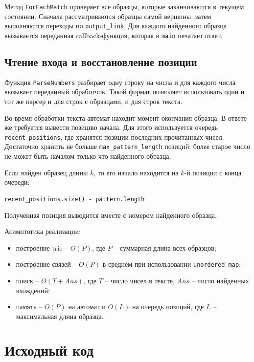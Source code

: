 Метод \texttt{ForEachMatch} проверяет все образцы, которые заканчиваются в текущем состоянии. Сначала
рассматриваются образцы самой вершины, затем выполняются переходы по \texttt{output\_link}. Для каждого
найденного образца вызывается переданная callback-функция, которая в \texttt{main} печатает ответ.

\subsection{Чтение входа и восстановление позиции}

Функция \texttt{ParseNumbers} разбирает одну строку на числа и для каждого числа вызывает переданный
обработчик. Такой формат позволяет использовать один и тот же парсер и для строк с образцами, и для
строк текста.

Во время обработки текста автомат находит момент окончания образца. В ответе же требуется вывести
позицию начала. Для этого используется очередь \texttt{recent\_positions}, где хранятся позиции последних
прочитанных чисел. Достаточно хранить не больше \texttt{max\_pattern\_length} позиций: более старое число
не может быть началом только что найденного образца.

Если найден образец длины \(k\), то его начало находится на \(k\)-й позиции с конца очереди:

\begin{center}
\texttt{recent\_positions.size() - pattern.length}
\end{center}

Полученная позиция выводится вместе с номером найденного образца.

Асимптотика реализации:
\begin{itemize}
\item построение trie -- \(O(P)\), где \(P\) -- суммарная длина всех образцов;
\item построение связей -- \(O(P)\) в среднем при использовании \texttt{unordered\_map};
\item поиск -- \(O(T + Ans)\), где \(T\) -- число чисел в тексте, \(Ans\) -- число найденных вхождений;
\item память -- \(O(P)\) на автомат и \(O(L)\) на очередь позиций, где \(L\) -- максимальная длина образца.
\end{itemize}

\section{Исходный код}

